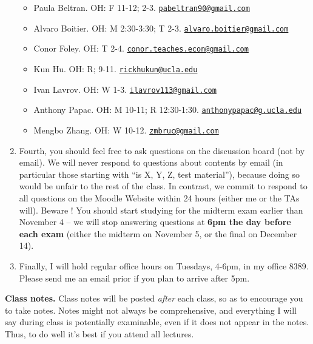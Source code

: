 \documentclass[]{book}
\providecommand{\tightlist}{%
  \setlength{\itemsep}{0pt}\setlength{\parskip}{0pt}}
\theoremstyle{definition}
\theoremstyle{definition}
\theoremstyle{definition}
\theoremstyle{remark}
\begin{document}
\begin{enumerate}
  \begin{itemize}
  \tightlist
  \item
    Paula Beltran. OH: F 11-12; 2-3.
    \href{mailto:pabeltran90@gmail.com}{\nolinkurl{pabeltran90@gmail.com}}
  \item
    Alvaro Boitier. OH: M 2:30-3:30; T 2-3.
    \href{mailto:alvaro.boitier@gmail.com}{\nolinkurl{alvaro.boitier@gmail.com}}
  \item
    Conor Foley. OH: T 2-4.
    \href{mailto:conor.teaches.econ@gmail.com}{\nolinkurl{conor.teaches.econ@gmail.com}}
  \item
    Kun Hu. OH: R; 9-11.
    \href{mailto:rickhukun@ucla.edu}{\nolinkurl{rickhukun@ucla.edu}}
  \item
    Ivan Lavrov. OH: W 1-3.
    \href{mailto:ilavrov113@gmail.com}{\nolinkurl{ilavrov113@gmail.com}}
  \item
    Anthony Papac. OH: M 10-11; R 12:30-1:30.
    \href{mailto:anthonypapac@g.ucla.edu}{\nolinkurl{anthonypapac@g.ucla.edu}}
  \item
    Mengbo Zhang. OH: W 10-12.
    \href{mailto:zmbruc@gmail.com}{\nolinkurl{zmbruc@gmail.com}}
  \end{itemize}
\item
  Fourth, you should feel free to ask questions on the discussion board
  (not by email). We will never respond to questions about contents by
  email (in particular those starting with ``is X, Y, Z, test
  material''), because doing so would be unfair to the rest of the
  class. In contrast, we commit to respond to all questions on the
  Moodle Website within 24 hours (either me or the TAs will). Beware !
  You should start studying for the midterm exam earlier than November 4
  -- we will stop answering questions at \textbf{6pm the day before each
  exam} (either the midterm on November 5, or the final on December 14).
\item
  Finally, I will hold regular office hours on Tuesdays, 4-6pm, in my
  office 8389. Please send me an email prior if you plan to arrive after
  5pm.
\end{enumerate}

\textbf{Class notes.} Class notes will be posted \emph{after} each
class, so as to encourage you to take notes. Notes might not always be
comprehensive, and everything I will say during class is potentially
examinable, even if it does not appear in the notes. Thus, to do well
it's best if you attend all lectures.
\end{document}
